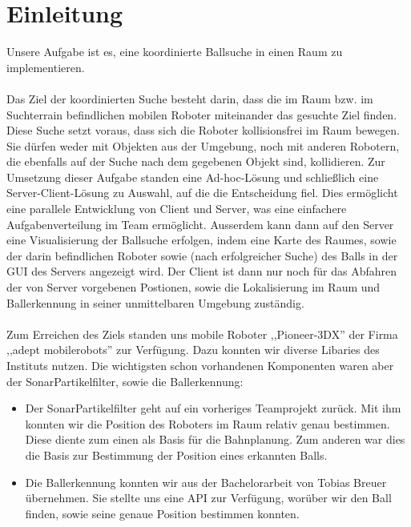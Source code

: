 
    \chapter{Einleitung}
    \label{einleitung}
    Unsere Aufgabe ist es, eine koordinierte Ballsuche in einen Raum
    zu implementieren. \\\\

Das Ziel der koordinierten Suche besteht darin, dass die im Raum bzw. im
Suchterrain befindlichen mobilen Roboter miteinander das gesuchte Ziel
finden. Diese Suche setzt voraus, dass sich die Roboter kollisionsfrei
im Raum bewegen. Sie dürfen weder mit Objekten aus der Umgebung, noch
mit anderen Robotern, die ebenfalls auf der Suche nach dem gegebenen
Objekt sind, kollidieren. Zur Umsetzung dieser Aufgabe standen eine
Ad-hoc-Lösung und schließlich eine Server-Client-Lösung zu Auswahl, auf
die die Entscheidung fiel. Dies ermöglicht eine parallele Entwicklung
von Client und Server, was eine einfachere Aufgabenverteilung im Team
ermöglicht. Ausserdem kann dann auf den Server eine Visualisierung der
Ballsuche erfolgen, indem eine Karte des Raumes, sowie der darin
befindlichen Roboter sowie (nach erfolgreicher Suche) des Balls in der
GUI des Servers angezeigt wird. Der Client ist dann nur noch für das
Abfahren der von Server vorgebenen Postionen, sowie die Lokalisierung
im Raum und Ballerkennung in seiner unmittelbaren Umgebung
zuständig. \\\\
Zum Erreichen des Ziels standen uns mobile Roboter 
    ,,Pioneer-3DX'' der Firma ,,adept mobilerobots'' zur
    Verfügung. Dazu konnten wir diverse Libaries des Instituts
    nutzen. Die wichtigsten schon vorhandenen Komponenten waren aber
    der SonarPartikelfilter, sowie die Ballerkennung:
    \begin{itemize}
    \item Der SonarPartikelfilter geht auf ein vorheriges Teamprojekt
      zurück. Mit ihm konnten wir die Position des Roboters im Raum
      relativ  genau bestimmen. Diese diente zum einen als
      Basis für die Bahnplanung. Zum anderen war dies die Basis zur
      Bestimmung der Position eines erkannten Balls.
    \item Die Ballerkennung konnten wir aus der Bachelorarbeit von
      Tobias Breuer übernehmen. Sie stellte uns eine API zur Verfügung,
      worüber wir den Ball finden, sowie seine genaue Position
      bestimmen konnten.
    \end{itemize}
